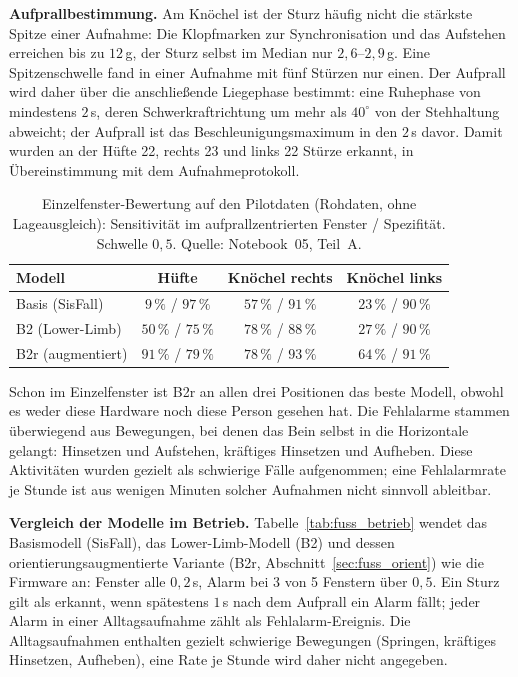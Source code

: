 \documentclass[11pt,a4paper,oneside]{report}
\begin{document}
\textbf{Aufprallbestimmung.} Am Knöchel ist der Sturz häufig nicht die
stärkste Spitze einer Aufnahme: Die Klopfmarken zur Synchronisation
und das Aufstehen erreichen bis zu $12$\,g, der Sturz selbst im Median
nur $2{,}6$--$2{,}9$\,g. Eine Spitzenschwelle fand in einer Aufnahme
mit fünf Stürzen nur einen. Der Aufprall wird daher über die
anschließende Liegephase bestimmt: eine Ruhephase von mindestens
$2$\,s, deren Schwerkraftrichtung um mehr als $40^{\circ}$ von der
Stehhaltung abweicht; der Aufprall ist das Beschleunigungsmaximum in
den $2$\,s davor. Damit wurden an der Hüfte 22, rechts 23 und links 22
Stürze erkannt, in Übereinstimmung mit dem Aufnahmeprotokoll.

\begin{table}[H]
\centering
\caption{Einzelfenster-Bewertung auf den Pilotdaten (Rohdaten, ohne
         Lageausgleich): Sensitivität im aufprallzentrierten Fenster /
         Spezifität. Schwelle $0{,}5$. Quelle: Notebook~05, Teil~A.}
\label{tab:fuss_pilot}
\small
\begin{tabularx}{\textwidth}{X c c c}
\toprule
\textbf{Modell} & \textbf{Hüfte} & \textbf{Knöchel rechts} & \textbf{Knöchel links} \\
\midrule
Basis (SisFall)      & $9\,\%$ / $97\,\%$  & $57\,\%$ / $91\,\%$ & $23\,\%$ / $90\,\%$ \\
B2 (Lower-Limb)      & $50\,\%$ / $75\,\%$ & $78\,\%$ / $88\,\%$ & $27\,\%$ / $90\,\%$ \\
B2r (augmentiert)    & $91\,\%$ / $79\,\%$ & $78\,\%$ / $93\,\%$ & $64\,\%$ / $91\,\%$ \\
\bottomrule
\end{tabularx}
\end{table}

Schon im Einzelfenster ist B2r an allen drei Positionen das beste
Modell, obwohl es weder diese Hardware noch diese Person gesehen hat.
Die Fehlalarme stammen überwiegend aus Bewegungen, bei denen das Bein
selbst in die Horizontale gelangt: Hinsetzen und Aufstehen, kräftiges
Hinsetzen und Aufheben. Diese Aktivitäten wurden gezielt als
schwierige Fälle aufgenommen; eine Fehlalarmrate je Stunde ist aus
wenigen Minuten solcher Aufnahmen nicht sinnvoll ableitbar.

\textbf{Vergleich der Modelle im Betrieb.} Tabelle~\ref{tab:fuss_betrieb}
wendet das Basismodell (SisFall), das Lower-Limb-Modell (B2) und
dessen orientierungsaugmentierte Variante (B2r,
Abschnitt~\ref{sec:fuss_orient}) wie die Firmware an: Fenster alle
$0{,}2$\,s, Alarm bei 3 von 5 Fenstern über $0{,}5$. Ein Sturz gilt als
erkannt, wenn spätestens $1$\,s nach dem Aufprall ein Alarm fällt; jeder
Alarm in einer Alltagsaufnahme zählt als Fehlalarm-Ereignis. Die
Alltagsaufnahmen enthalten gezielt schwierige Bewegungen (Springen,
kräftiges Hinsetzen, Aufheben), eine Rate je Stunde wird daher nicht
angegeben.
\end{document}
